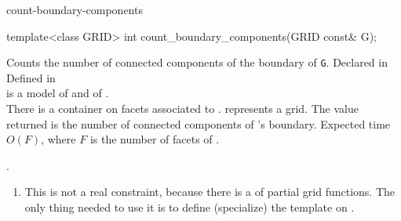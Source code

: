 \begin{Label}{count-boundary-components}
\end{Label}


\begin{example}
template<class GRID>
int count\_boundary\_components(GRID const& G);
\end{example}

Counts the number of connected components of the boundary of {\tt G}.
Declared in \\
Defined  in \\

 is a model of 
 and of
.\\
There is a 
container on facets
associated to  .
 represents a  grid.
The value returned is the number of connected components of 's boundary.
Expected time $O(F)$, where $F$ is the number of facets of .

 .


\begin{enumerate}
\item \label{note-cbc-partial-gf}
This is not a real constraint, because there is a 
of partial grid functions.
The only thing needed to use it is to define (specialize)
the 
template on .
\end{enumerate}

